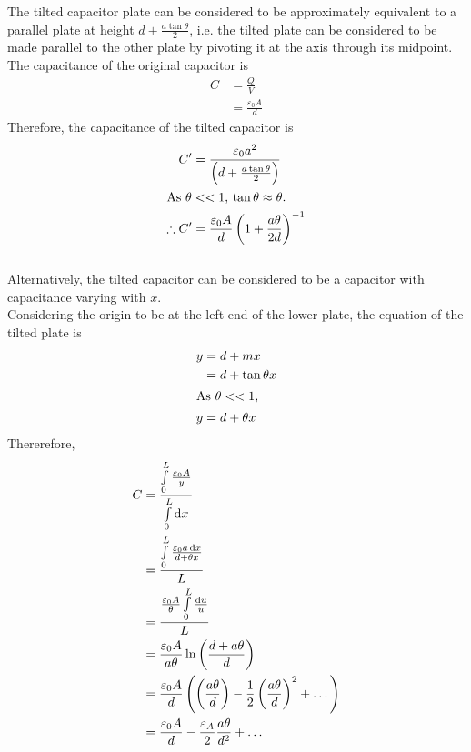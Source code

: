 \documentclass[fleqn, a4paper, 8pt, twoside]{amsart}
\theoremstyle{definition}
\theoremstyle{theorem}
\begin{document}
\begin{multicols}{2}
\begin{spacing}{0.6}
\begin{solution}
	The tilted capacitor plate can be considered to be approximately equivalent to a parallel plate at height $d + \frac{a \tan \theta}{2}$, i.e. the tilted plate can be considered to be made parallel to the other plate by pivoting it at the axis through its midpoint.\\
	The capacitance of the original capacitor is
	\begin{align*}
		C & = \frac{Q}{V} \\
                  & = \frac{\varepsilon_0 A}{d}
	\end{align*}
	Therefore, the capacitance of the tilted capacitor is
	\begin{align*}
		C'            & = \frac{\varepsilon_0 a^2}{\left( d + \frac{a \tan \theta}{2} \right)} \\
		\intertext{As $\theta << 1$, $\tan \theta \approx \theta$.}
		\therefore C' & = \frac{\varepsilon_0 A}{d} \left( 1 + \frac{a \theta}{2 d} \right)^{-1}
	\end{align*}
	~\\
	Alternatively, the tilted capacitor can be considered to be a capacitor with capacitance varying with $x$.\\
	Considering the origin to be at the left end of the lower plate, the equation of the tilted plate is
	\begin{align*}
		y & = d + m x           \\
                  & = d + \tan \theta x \\
		\intertext{As $\theta << 1$,}
		y & = d + \theta x
	\end{align*}
	Thererefore,
	\begin{align*}
		C & = \frac{\int\limits_{0}^{L} \frac{\varepsilon_0 A}{y}}{\int\limits_{0}^{L} \dif x}                                                     \\
                  & = \frac{\int\limits_{0}^{L} \frac{\varepsilon_0 a \dif x}{d + \theta x}}{L}                                                            \\
                  & = \frac{\frac{\varepsilon_0 A}{\theta} \int\limits_{0}^{L} \frac{\dif u}{u}}{L}                                                        \\
                  & = \frac{\varepsilon_0 A}{a \theta} \ln \left( \frac{d + a \theta}{d} \right)                                                           \\
                  & = \frac{\varepsilon_0 A}{d} \left( \left( \frac{a \theta}{d} \right) - \frac{1}{2} \left( \frac{a \theta}{d} \right)^2 + \dots \right) \\
                  & = \frac{\varepsilon_0 A}{d} - \frac{\varepsilon_A}{2} \frac{a \theta}{d^2} + \dots
	\end{align*}
\end{solution}


\end{spacing}
\end{multicols}
\end{document}
